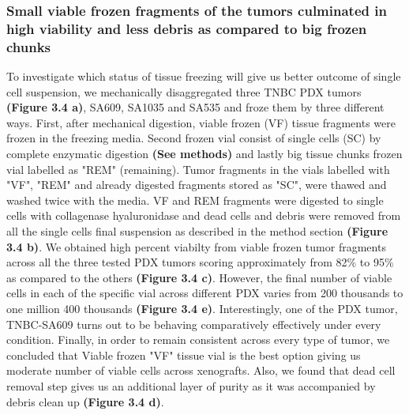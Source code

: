 \subsubsection{Small viable frozen fragments of the tumors culminated in high viability and less debris as compared to big frozen chunks}
To investigate which status of tissue freezing will give us better outcome of single cell suspension, we mechanically disaggregated three TNBC PDX tumors \textbf{(Figure 3.4 a)}, SA609, SA1035 and SA535 and froze them by three different ways. First, after mechanical digestion, viable frozen (VF) tissue fragments were frozen in the freezing media. Second frozen vial consist of single cells (SC) by complete enzymatic digestion \textbf{(See methods)} and lastly big tissue chunks frozen vial labelled as "REM" (remaining). Tumor fragments in the vials labelled with "VF", "REM" and already digested fragments stored as "SC", were thawed and washed twice with the media. VF and REM fragments were digested to single cells with collagenase hyaluronidase and dead cells and debris were removed from all the single cells final suspension as described in the method section \textbf{(Figure 3.4 b)}. We obtained high percent viabilty from viable frozen tumor fragments across all the three tested PDX tumors scoring approximately from 82\% to 95\% as compared to the others \textbf{(Figure 3.4 c)}. However, the final number of viable cells in each of the specific vial across different PDX varies from 200 thousands to one million 400 thousands  \textbf{(Figure 3.4 e)}.  Interestingly, one of the PDX tumor, TNBC-SA609 turns out to be behaving comparatively effectively under every condition. 
Finally, in order to  remain consistent across every type of tumor, we concluded that Viable frozen "VF" tissue vial is the best option giving us moderate number of viable cells across xenografts. Also, we found that dead cell removal step gives us an additional layer of purity as it was accompanied by debris clean up \textbf{(Figure 3.4 d)}.



